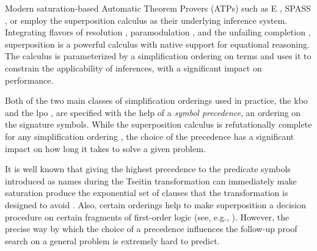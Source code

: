 




Modern saturation-based Automatic Theorem Provers (ATPs) such as E \cite{Schulz2019}, SPASS \cite{DBLP:conf/cade/WeidenbachDFKSW09},
or \Vampire{} \cite{DBLP:conf/cav/KovacsV13}
employ the superposition calculus \cite{DBLP:journals/logcom/BachmairG94,DBLP:books/el/RV01/NieuwenhuisR01} as their underlying inference system.
Integrating flavors of resolution \cite{DBLP:books/el/RV01/BachmairG01}, paramodulation \cite{Robinson1983}, and 
the unfailing completion \cite{Bachmair89completionwithout}, superposition is a powerful calculus with 
native support for equational reasoning. The calculus is parameterized by a simplification ordering on terms %
and uses it to constrain the applicability of inferences, with a significant impact on performance.

Both of the two main classes of simplification orderings used in practice,
the \acrlong*{kbo} \cite{Knuth1983}
and the \acrlong*{lpo} \cite{Kamin1980},
are specified with the help of a 
\emph{symbol precedence}, an ordering on the signature symbols. %
While the superposition calculus is refutationally complete for any simplification ordering \cite{DBLP:journals/logcom/BachmairG94},
the choice of the precedence has a significant impact on how long it takes to solve a given problem.

It is well known that giving the highest precedence to the predicate symbols introduced as names 
during the Tseitin transformation %
\cite{Tseitin1983} can immediately make saturation produce the exponential 
set of clauses that the transformation is designed to avoid \cite{Reger2016}.
Also, certain orderings help to make superposition a decision procedure on certain fragments of first-order logic 
(see, e.g., \cite{DBLP:conf/lics/GanzingerN99,DBLP:conf/cade/HustadtKS05}).
However, the precise way by which the choice of a precedence 
influences the follow-up proof search on a general problem is extremely hard to predict. %

